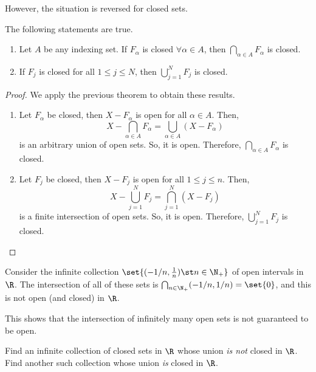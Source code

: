 However, the situation is reversed for closed sets.
\begin{nthm}
  The following statements are true.
  \begin{enumerate}
  \item Let $A$ be any indexing set. If $F_{\alpha}$ is closed $\forall\alpha\in A$, then $\bigcap_{\alpha\in A} F_{\alpha}$ is closed.
  \item If $F_{j}$ is closed for all $1 \leq j \leq N$, then $\bigcup_{j=1}^{N} F_{j}$ is closed.
  \end{enumerate}
\end{nthm}
\begin{proof}
  We apply the previous theorem to obtain these results.
  \begin{enumerate}
  \item Let $F_{\alpha}$ be closed, then $X-F_{\alpha}$ is open for all $\alpha \in A$. Then,
  \begin{equation*}
    X - \bigcap_{\alpha\in A} F_{\alpha}
    =  \bigcup_{\alpha\in A} \left(X - F_{\alpha}\right)
  \end{equation*}
  is an arbitrary union of open sets. So, it is open. Therefore, $\bigcap_{\alpha\in A} F_{\alpha}$ is closed.

  \item Let $F_{j}$ be closed, then $X-F_{j}$ is open for all $1 \leq j \leq n$. Then,
  \begin{equation*}
    X - \bigcup_{j=1}^{N} F_{j}
    =  \bigcap_{j=1}^{N} \left(X - F_{j}\right)
  \end{equation*}
  is a finite intersection of open sets. So, it is open. Therefore, $\bigcup_{j=1}^{N} F_{j}$ is closed.
  \end{enumerate}
\end{proof}

\begin{negg}
  Consider the infinite collection $\set{(-1/n, \frac{1}{n}) \st n \in \N_{+}}$ of open intervals in $\R$. The intersection of all of these sets is $\bigcap_{n \in \N_{+}} (-1/n, 1/n) = \set{0}$, and this is not open (and closed) in $\R$.

  This shows that the intersection of infinitely many open sets is not guaranteed to be open.
\end{negg}

\begin{nex}
  Find an infinite collection of closed sets in $\R$ whose union \emph{is not} closed in $\R$. Find another such collection whose union \emph{is} closed in $\R$.
\end{nex}



